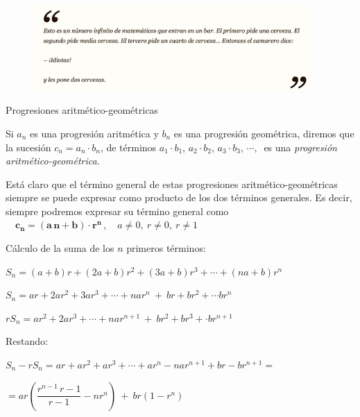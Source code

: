  
\vspace{1.5cm}%
\begin{figure}[H]
	\centering
	\includegraphics[width=0.95\textwidth]{img-suc/suc09.png}
\end{figure}
\vspace{1.5cm}%

\vspace{15mm}
\begin{myalertblock}{Progresiones aritmético-geométricas}

\vspace{2mm} Si $a_n$ es una progresión aritmética y $b_n$ es una progresión geométrica, diremos que la sucesión $c_n= a_n \cdot b_n$, de términos $a_1 \cdot b_1,\,  a_2 \cdot  b_2,\,  a_3 \cdot b_3,\, \cdots ,\  $ es una \emph{progresión aritmético-geométrica}.

\vspace{2mm} Está claro que el término general de estas progresiones aritmético-geométricas siempre se puede expresar como  producto de los dos términos generales. Es decir, siempre podremos expresar su término general como $\quad \boldsymbol{c_n=(a\, n+b)\cdot r^n}\, , \quad a\neq 0, \ r\neq 0, \ r\neq 1$


\vspace{2mm} Cálculo de la suma de los $n$ primeros términos:

\vspace{2mm} $S_n=(a+b)r+(2a+b)r^2+(3a+b)r^3+\cdots+(na+b)r^n$

\vspace{2mm} $S_n=ar+2ar^2+3ar^3+\cdots + nar^n\ + \ br+br^2+\cdots br^n$

\vspace{2mm} $rS_n=ar^2+2ar^3+\cdots + nar^{n+1}\ + \ br^2+br^3+\cdot br^{n+1}$

\vspace{2mm} Restando: 

\vspace{2mm} $S_n-rS_n=ar+ar^2+ar^3+\cdots +ar^n-nar^{n+1}+br-br^{n+1}=$

$=ar\left(\dfrac{r^{n-1}\, r-1}{r-1}-nr^n\right)\ + \ br(1-r^n)$


\end{myalertblock}
